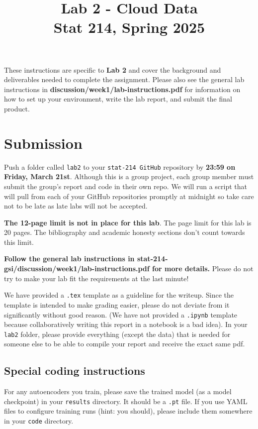 \documentclass[letterpaper,12pt]{article}
\title{Lab 2 - Cloud Data\\Stat 214, Spring 2025\vspace{-2em}}
\date{}
\begin{document}
\maketitle

These instructions are specific to \textbf{Lab 2} and cover the background and deliverables needed to complete the assignment. Please also see the general lab instructions in \textbf{discussion/week1/lab-instructions.pdf} for information on how to set up your environment, write the lab report, and submit the final product.

\tableofcontents

\section{Submission}
Push a folder called \texttt{lab2} to your \texttt{stat-214 GitHub} repository by \textbf{23:59 on Friday, March 21st}. Although this is a group project, each group member must submit the group's report and code in their own repo. We will run a script that will pull from each of your GitHub repositories promptly at midnight so take care not to be late as late labs will not be accepted.

\textbf{The 12-page limit is not in place for this lab}. The page limit for this lab is 20 pages. The bibliography and academic honesty sections don't count towards this limit.

\textbf{Follow the general lab instructions in stat-214-gsi/discussion/week1/lab-instructions.pdf for more details.} Please do not try to make your lab fit the requirements at the last minute!

We have provided a \texttt{.tex} template as a guideline for the writeup. Since the template is intended to make grading easier, please do not deviate from it significantly without good reason. (We have not provided a \texttt{.ipynb} template because collaboratively writing this report in a notebook is a bad idea). In your \texttt{lab2} folder, please provide everything (except the data) that is needed for someone else to be able to compile your report and receive the exact same pdf.

\subsection{Special coding instructions}
For any autoencoders you train, please save the trained model (as a model checkpoint) in your \texttt{results} directory. It should be a \texttt{.pt} file. If you use YAML files to configure training runs (hint: you should), please include them somewhere in your \texttt{code} directory.
\end{document}
